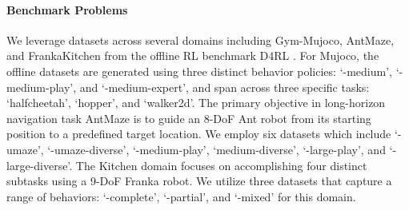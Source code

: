 \fi



\paragraph{Benchmark Problems}
We leverage datasets across several domains including Gym-Mujoco, AntMaze, and FrankaKitchen from the offline RL benchmark D4RL \citep{fu2020d4rl}.  For Mujoco, the offline datasets are generated using three distinct behavior policies: `-medium', `-medium-play', and `-medium-expert', and span across three specific tasks: `halfcheetah', `hopper', and `walker2d'. 
The primary objective in long-horizon navigation task AntMaze is to guide an 8-DoF Ant robot from its starting position to a predefined target location. We employ six datasets which include `-umaze', `-umaze-diverse', `-medium-play', `medium-diverse', `-large-play', and `-large-diverse'. The Kitchen domain focuses on  accomplishing four distinct subtasks using a 9-DoF Franka robot. We utilize three datasets that capture a range of behaviors: `-complete', `-partial’, and `-mixed’ for this domain.

\iffalse
For MuJoCo, we incorporate nine version 2 (v2) datasets. These datasets are generated using three distinct behavior policies: `-medium', `-medium-play', and `-medium-expert', and span across three specific tasks: `halfcheetah', `hopper', and `walker2d'. The primary objective in long-horizon navigation task AntMaze is to guide an 8-DoF Ant robot from its starting position to a predefined target location. For this, we employ six version 2 (v2) datasets which include `-umaze', `-umaze-diverse', `-medium-play', `medium-diverse', `-large-play', and `-large-diverse'. The Kitchen domain focuses on  accomplishing four distinct subtasks using a 9-DoF Franka robot. We utilize three version 0 (v0) datasets that capture a range of behaviors: `-complete', `-partial’, and `-mixed’ for this domain.

\fi

